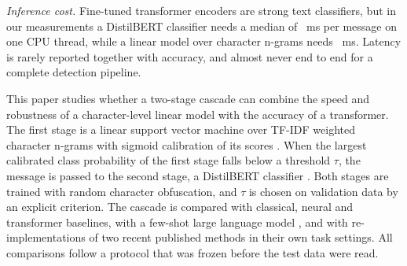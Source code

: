 \emph{Inference cost.} Fine-tuned transformer encoders \cite{devlin2019,sanh2019,liu2019} are strong text classifiers, but in our measurements a DistilBERT classifier needs a median of ~ms per message on one CPU thread, while a linear model over character n-grams needs ~ms. Latency is rarely reported together with accuracy, and almost never end to end for a complete detection pipeline.

This paper studies whether a two-stage cascade can combine the speed and robustness of a character-level linear model with the accuracy of a transformer. The first stage is a linear support vector machine over TF-IDF weighted character n-grams \cite{cortes1995,joachims1998} with sigmoid calibration of its scores \cite{niculescu2005}. When the largest calibrated class probability of the first stage falls below a threshold $\tau$, the message is passed to the second stage, a DistilBERT classifier \cite{sanh2019}. Both stages are trained with random character obfuscation, and $\tau$ is chosen on validation data by an explicit criterion. The cascade is compared with classical, neural and transformer baselines, with a few-shot large language model \cite{qwen2024}, and with re-implementations of two recent published methods \cite{mahmud2024,shim2024} in their own task settings. All comparisons follow a protocol that was frozen before the test data were read.

